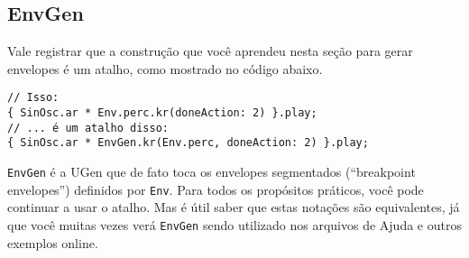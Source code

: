 \subsection{EnvGen}

Vale registrar que a construção que você aprendeu nesta seção para gerar envelopes é um atalho, como mostrado no código abaixo.

\begin{lstlisting}[style=SuperCollider-IDE, basicstyle=\scttfamily\footnotesize]
// Isso:
{ SinOsc.ar * Env.perc.kr(doneAction: 2) }.play;
// ... é um atalho disso:
{ SinOsc.ar * EnvGen.kr(Env.perc, doneAction: 2) }.play;
\end{lstlisting}

\texttt{EnvGen} é a UGen que de fato toca os envelopes segmentados (“breakpoint envelopes”) definidos por \texttt{Env}. Para todos os propósitos práticos, você pode continuar a usar o atalho. Mas é útil saber que estas notações são equivalentes, já que você muitas vezes verá  \texttt{EnvGen} sendo utilizado nos arquivos de Ajuda e outros exemplos online.

